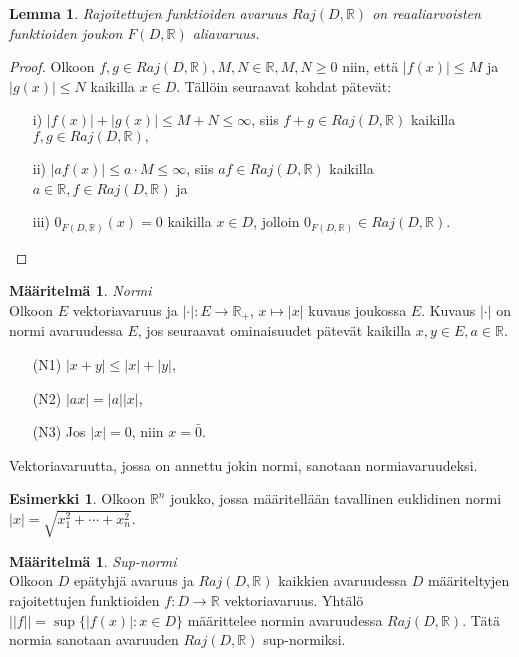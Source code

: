 \documentclass[12pt,a4paper,leqno]{report}
\newcommand{\R}{\mathbb{R}}
\theoremstyle{plain}
\newtheorem{lem}[equation]{Lemma}
\theoremstyle{definition}
\newtheorem{maar}[equation]{Määritelmä}
\newtheorem{esim}[equation]{Esimerkki}
\theoremstyle{remark}
\begin{document}
\begin{lem}
Rajoitettujen funktioiden avaruus $Raj(D,\R )$ on reaaliarvoisten funktioiden joukon $F(D,\R)$ aliavaruus.
\end{lem}
\begin{proof}
 Olkoon $f,g\in Raj(D,\R),M,N\in\R, M,N\geq 0$ niin, että $|f(x)|\leq M$ ja $|g(x)|\leq N$ kaikilla $x\in D$. Tällöin seuraavat kohdat pätevät: 
\begin{itemize}
\item[i)\phantom{iiv}] $|f(x)|+|g(x)|\leq M+N\leq\infty$, siis $f+g\in Raj(D,\R)$ kaikilla $f,g\in Raj(D,\R),$
\item[ii)\phantom{iv}] $|af(x)|\leq a\cdot M\leq\infty$, siis $af\in Raj(D,\R)$ kaikilla $a\in\R, f\in Raj(D,\R)$ ja
\item[iii)\phantom{v}] $0_{F(D,\R)}(x)=0$ kaikilla $x\in D$, jolloin $0_{F(D,\R)} \in Raj(D,\R )$.
\end{itemize}
\end{proof}

\begin{maar} \emph{Normi}\\
Olkoon $E$ vektoriavaruus ja $|\cdot|\colon E\rightarrow \R_+$, $x\mapsto|x|$ kuvaus joukossa $E$. %
Kuvaus $|\cdot|$ on normi avaruudessa $E$, jos seuraavat ominaisuudet pätevät kaikilla $ x,y\in E, a\in\R$.
\begin{itemize}
\item[(N1)]$|x+y|\leq |x|+|y|$,
\item[(N2)]$|ax|=|a||x|$,
\item[(N3)]Jos $|x|=0$, niin $x=\bar{0}$.
\end{itemize} 
Vektoriavaruutta, jossa on annettu jokin normi, sanotaan normiavaruudeksi.

\end{maar} 

\begin{esim}
Olkoon $\R ^n$ joukko, jossa määritellään tavallinen euklidinen normi $|x| = \sqrt{x^{2}_{1} + \cdots +x^{2}_{n}}$.

\end{esim}

\begin{maar} \emph{Sup-normi}\\
Olkoon $D$ epätyhjä avaruus ja $Raj(D,\R )$ kaikkien avaruudessa $D$ määriteltyjen rajoitettujen funktioiden $f\colon D\rightarrow \R$ vektoriavaruus. Yhtälö $||f||=\sup\{|f(x)|\colon x\in D\}$ määrittelee normin avaruudessa $Raj(D,\R )$. %
Tätä normia sanotaan avaruuden $Raj(D,\R )$ sup-normiksi.

\end{maar} 
\end{document}
